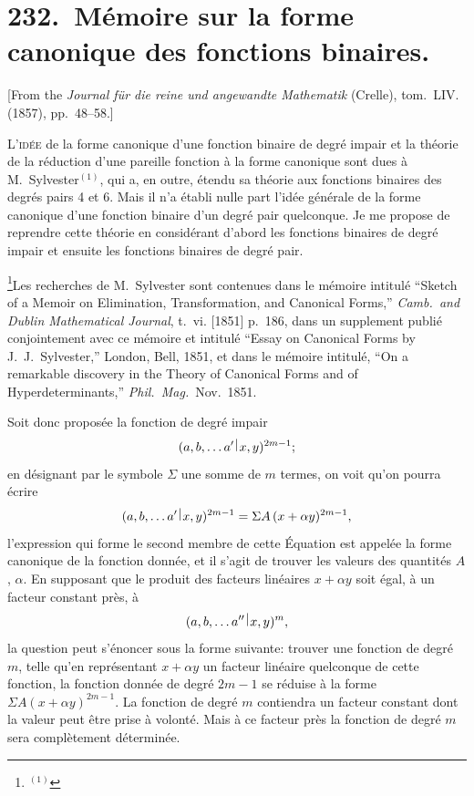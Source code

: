 \documentclass[11pt,a4paper]{book}
\theoremstyle{plain}
\newcommand{\wrule}{\hspace{-0.1em}\mid\hspace{-0.1em}}
\begin{document}
\chapter[M\'{e}moire sur la forme canonique des fonctions binaires]{232.\ M\'{e}moire sur la forme canonique des fonctions binaires.}
\label{paper232}

\begin{center}
\small
[From the \textit{Journal f\"{u}r die reine und angewandte Mathematik} (Crelle), tom.~LIV. (1857), pp.~48--58.]
\end{center}

\bigskip

\textsc{L'id\'{e}e} de la forme canonique d'une fonction binaire de degr\'{e} impair et la th\'{e}orie de la r\'{e}duction d'une pareille fonction \`{a} la forme canonique sont dues \`{a} M.~Sylvester$^{(1)}$, qui a, en outre, \'{e}tendu sa th\'{e}orie aux fonctions binaires des degr\'{e}s pairs 4 et 6. Mais il n'a \'{e}tabli nulle part l'id\'{e}e g\'{e}n\'{e}rale de la forme canonique d'une fonction binaire d'un degr\'{e} pair quelconque. Je me propose de reprendre cette th\'{e}orie en consid\'{e}rant d'abord les fonctions binaires de degr\'{e} impair et ensuite les fonctions binaires de degr\'{e} pair.

\footnote{$^{(1)}$}{Les recherches de M.~Sylvester sont contenues dans le m\'{e}moire intitul\'{e} ``Sketch of a Memoir on Elimination, Transformation, and Canonical Forms,'' \textit{Camb.\ and Dublin Mathematical Journal}, t.~vi. [1851] p.~186, dans un supplement publi\'{e} conjointement avec ce m\'{e}moire et intitul\'{e} ``Essay on Canonical Forms by J.~J.~Sylvester,'' London, Bell, 1851, et dans le m\'{e}moire intitul\'{e}, ``On a remarkable discovery in the Theory of Canonical Forms and of Hyperdeterminants,'' \textit{Phil.\ Mag.}\ Nov.\ 1851.}

Soit donc propos\'{e}e la fonction de degr\'{e} impair
\[
(a,b,\ldots a'\,\raisebox{0.5ex}{$\wrule$}\,x,y)^{2m-1};
\]
en d\'{e}signant par le symbole $\Sigma$ une somme de $m$ termes, on voit qu'on pourra \'{e}crire
\[
(a,b,\ldots a'\,\raisebox{0.5ex}{$\wrule$}\,x,y)^{2m-1}=\Sigma A\,(x+\alpha y)^{2m-1},
\]
l'expression qui forme le second membre de cette \'{E}quation est appel\'{e}e la forme canonique de la fonction donn\'{e}e, et il s'agit de trouver les valeurs des quantit\'{e}s $A$, $\alpha$. En supposant que le produit des facteurs lin\'{e}aires $x+\alpha y$ soit \'{e}gal, \`{a} un facteur constant pr\`{e}s, \`{a}
\[
(a,b,\ldots a''\,\raisebox{0.5ex}{$\wrule$}\,x,y)^m,
\]
la question peut s'\'{e}noncer sous la forme suivante: trouver une fonction de degr\'{e} $m$, telle qu'en repr\'{e}sentant $x+\alpha y$ un facteur lin\'{e}aire quelconque de cette fonction, la fonction donn\'{e}e de degr\'{e} $2m-1$ se r\'{e}duise \`{a} la forme $\Sigma A(x+\alpha y)^{2m-1}$. La fonction de degr\'{e} $m$ contiendra un facteur constant dont la valeur peut \^{e}tre prise \`{a} volont\'{e}. Mais \`{a} ce facteur pr\`{e}s la fonction de degr\'{e} $m$ sera compl\`{e}tement d\'{e}termin\'{e}e.
\end{document}
